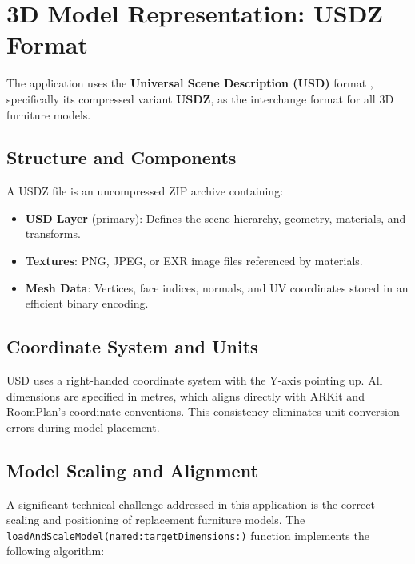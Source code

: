 \section{3D Model Representation: USDZ Format}
\label{sec:usdz}

The application uses the \textbf{Universal Scene Description (USD)} format \cite{pixar_usd}, specifically its compressed variant \textbf{USDZ}, as the interchange format for all 3D furniture models.

\subsection{Structure and Components}

A USDZ file is an uncompressed ZIP archive containing:

\begin{itemize}
    \item \textbf{USD Layer} (primary): Defines the scene hierarchy, geometry, materials, and transforms.
    \item \textbf{Textures}: PNG, JPEG, or EXR image files referenced by materials.
    \item \textbf{Mesh Data}: Vertices, face indices, normals, and UV coordinates stored in an efficient binary encoding.
\end{itemize}

\subsection{Coordinate System and Units}

USD uses a right-handed coordinate system with the Y-axis pointing up. All dimensions are specified in metres, which aligns directly with ARKit and RoomPlan's coordinate conventions. This consistency eliminates unit conversion errors during model placement.

\subsection{Model Scaling and Alignment}

A significant technical challenge addressed in this application is the correct scaling and positioning of replacement furniture models. The \texttt{loadAndScaleModel(named:targetDimensions:)} function implements the following algorithm:

